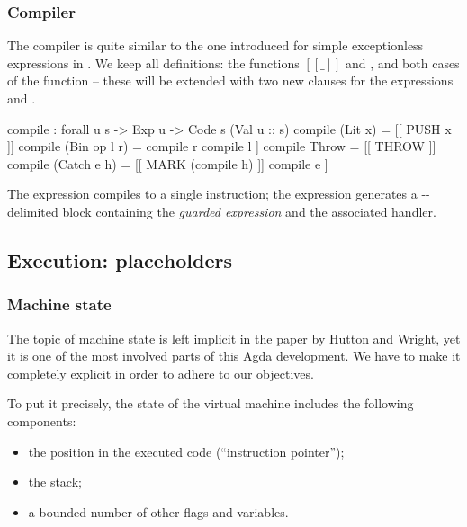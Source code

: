\subsubsection{Compiler}


The compiler is quite similar to the one introduced for simple exceptionless
expressions in . We keep all definitions: the
functions $[\!\![\_]\!\!]$ and , and both cases of the function
 -- these will be extended with two new clauses for the expressions
 and .

\label{sec:gmh-ham-compile}\begin{code}
compile : forall {u s} -> Exp u -> Code s (Val u :: s)
compile (Lit x) = [[ PUSH x ]]
compile (Bin op l r) = compile r \app compile l \app [[ opInstr op ]] 
compile Throw = [[ THROW ]]
compile (Catch e h) = [[ MARK (compile h) ]] \app compile e \app [[ UNMARK ]]
\end{code}

The expression  compiles to a single  instruction;
the expression  generates a --delimited
block containing the \emph{guarded expression} and the associated handler.

\subsection{Execution: placeholders}

\subsubsection{Machine state}

The topic of machine state is left implicit in the paper by Hutton and Wright,
yet it is one of the most involved parts of this Agda development. We have to
make it completely explicit in order to adhere to our objectives.

To put it precisely, the state of the virtual machine includes
the following components:
\begin{itemize}
	\item the position in the executed code (``instruction pointer'');
	\item the stack;
	\item a bounded number of other flags and variables.
\end{itemize}

